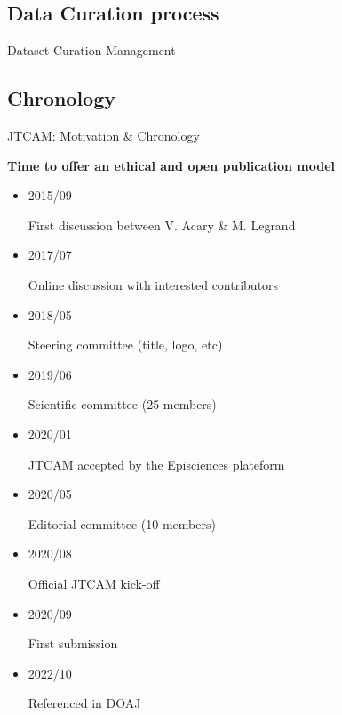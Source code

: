 \documentclass[10pt,compress,serif,aspectratio=169]{beamer}
\newcommand{\fig}[2]{\centering{\texttt{[image: \#2]}}}
\begin{document}

\subsection{Data Curation process}
\begin{frame}[t]{Dataset Curation Management}
\fig{.8}{data_curation}
\end{frame}


\subsection{Chronology}
\begin{frame}[t]{JTCAM: Motivation \& Chronology}

 \begin{center}
   \Large
   \textbf{Time to offer an ethical and open publication model}
 \end{center}
\vfill
 \begin{itemize}
  \item \parbox{1.5cm}{2015/09} First discussion between V. Acary \& M. Legrand\\[.5em]
  \item \parbox{1.5cm}{2017/07} Online discussion with interested contributors\\[.5em]
  \item \parbox{1.5cm}{2018/05} Steering committee (title, logo, etc)\\[.5em]
  \item \parbox{1.5cm}{2019/06} Scientific committee (25 members)\\[.5em]
  \item \parbox{1.5cm}{2020/01} JTCAM accepted by the Episciences plateform\\[.5em]
  \item \parbox{1.5cm}{2020/05} Editorial committee (10 members)\\[.5em]
  \item \parbox{1.5cm}{2020/08} Official JTCAM kick-off\\[.5em]
  \item \parbox{1.5cm}{2020/09} First submission
  \item \parbox{1.5cm}{2022/10} Referenced in DOAJ
 \end{itemize}

\end{frame}


\end{document}
